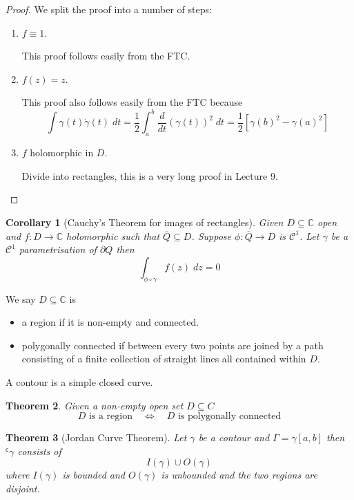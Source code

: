 \documentclass[11pt]{article}
\newcommand{\stcmp}{^{\mathsf{c}}}
\newcommand{\C}{\mathbb{C}}
\newenvironment{defin}
	{\begin{mdframed}[backgroundcolor=white, roundcorner=5pt, linewidth=1pt]}
	{\end{mdframed}}
\newcommand{\mdf}[1]{{\color{red} #1}}
\newtheorem{theorem}{Theorem}[section]
\newtheorem{cor}[theorem]{Corollary}
\begin{document}
\begin{proof}
We split the proof into a number of steps:
\begin{enumerate}
	\item $f\equiv 1$.

	This proof follows easily from the FTC.
	\item $f(z)=z$.

	This proof also follows easily from the FTC because
	\[
		\int\gamma(t)\dot{\gamma}(t)\;dt=\frac{1}{2}\int_a^b \frac{d}{dt}\left(\gamma(t)\right)^2\; dt = \frac{1}{2}\left[\gamma(b)^2 - \gamma(a)^2\right]
	\]
	\item $f$ holomorphic in $D$.

	Divide into rectangles, this is a very long proof in Lecture 9.
\end{enumerate}
\end{proof}

\begin{cor}[Cauchy's Theorem for images of rectangles]
	Given $D\subseteq\C$ open and $f:D\to\C$ holomorphic such that $\overline{Q}\subseteq D$.
	Suppose $\phi:\overline{Q}\to D$ is $\mathcal{C}^1$.
Let $\gamma$ be a $\mathcal{C}^1$ parametrisation of $\partial Q$ then
\[
	\int_{\phi\circ\gamma} f(z)\;dz =0
\]
\end{cor}

\begin{defin}
We say $D\subseteq \C$ is
\begin{itemize}
	\item a \mdf{region} if it is non-empty and connected.
	\item \mdf{polygonally connected} if between every two points are joined by a path consisting of a finite collection of straight lines all contained within $D$.
\end{itemize}
A \mdf{contour} is a simple closed curve.
\end{defin}

\begin{theorem}
Given a non-empty open set $D\subseteq C$
\[
	D\text{ is a region}\quad\iff\quad D\text{ is polygonally connected}
\]
\end{theorem}

\begin{theorem}[Jordan Curve Theorem]
Let $\gamma$ be a contour and $\Gamma=\gamma[a, b]$ then $\stcmp{\gamma}$ consists of
\[
	I(\gamma)\cup O(\gamma)
\]
where $I(\gamma)$ is bounded and $O(\gamma)$ is unbounded and the two regions are disjoint.
\end{theorem}
\end{document}
